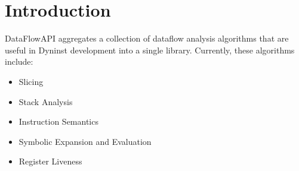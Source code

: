 \section{Introduction}
\label{sec:intro}

DataFlowAPI aggregates a collection of dataflow analysis algorithms that are useful in Dyninst development into a single library. Currently, these algorithms include:
\begin{itemize}
\item Slicing
\item Stack Analysis
\item Instruction Semantics
\item Symbolic Expansion and Evaluation
\item Register Liveness
\end{itemize}